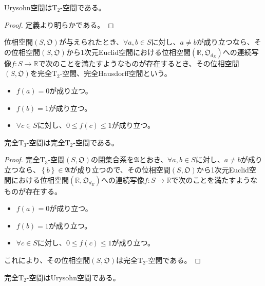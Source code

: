 \documentclass[dvipdfmx]{jsarticle}
\begin{document}
\begin{thm}\label{8.1.7.26} Urysohn空間は$\mathrm{T}_{2}$-空間である。
\end{thm}
\begin{proof} 定義より明らかである。
\end{proof}
\begin{dfn}
位相空間$\left( S,\mathfrak{O} \right)$が与えられたとき、$\forall a,b \in S$に対し、$a \neq b$が成り立つなら、その位相空間$\left( S,\mathfrak{O} \right)$から1次元Euclid空間における位相空間$\left( \mathbb{R},\mathfrak{O}_{d_{E}} \right)$への連続写像$f:S \rightarrow \mathbb{R}$で次のことを満たすようなものが存在するとき、その位相空間$\left( S,\mathfrak{O} \right)$を完全$\mathrm{T}_{2}$-空間、完全Hausdorff空間という。
\begin{itemize}
\item
  $f(a) = 0$が成り立つ。
\item
  $f(b) = 1$が成り立つ。
\item
  $\forall c \in S$に対し、$0 \leq f(c) \leq 1$が成り立つ。
\end{itemize}
\end{dfn}
\begin{thm}\label{8.1.7.27} 完全$\mathrm{T}_{3}$-空間は完全$\mathrm{T}_{2}$-空間である。
\end{thm}
\begin{proof}
完全$\mathrm{T}_{3}$-空間$\left( S,\mathfrak{O} \right)$の閉集合系を$\mathfrak{A}$とおき、$\forall a,b \in S$に対し、$a \neq b$が成り立つなら、$\left\{ b \right\}\in \mathfrak{A}$が成り立つので、その位相空間$\left( S,\mathfrak{O} \right)$から1次元Euclid空間における位相空間$\left( \mathbb{R},\mathfrak{O}_{d_{E}} \right)$への連続写像$f:S \rightarrow \mathbb{R}$で次のことを満たすようなものが存在する。
\begin{itemize}
\item
  $f(a) = 0$が成り立つ。
\item
  $f(b) = 1$が成り立つ。
\item
  $\forall c \in S$に対し、$0 \leq f(c) \leq 1$が成り立つ。
\end{itemize}
これにより、その位相空間$\left( S,\mathfrak{O} \right)$は完全$\mathrm{T}_{2}$-空間である。
\end{proof}
\begin{thm}\label{8.1.7.28} 完全$\mathrm{T}_{2}$-空間はUrysohn空間である。
\end{thm}
\end{document}
